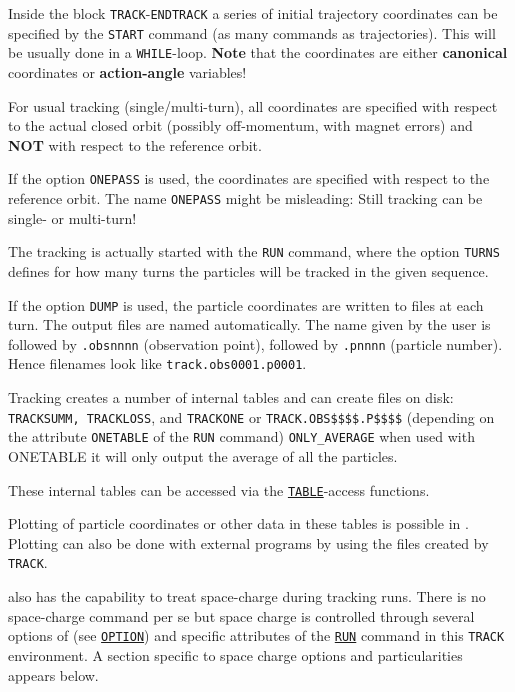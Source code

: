 Inside the block \texttt{TRACK}-\texttt{ENDTRACK} a series 
of initial trajectory coordinates can be specified by the \texttt{START} 
command (as many commands as trajectories). This will be usually done in a 
\texttt{WHILE}-loop. \textbf{Note} that the coordinates are either 
\textbf{canonical} coordinates or \textbf{action-angle} variables!

For usual tracking (single/multi-turn), all coordinates are specified
with respect to the actual closed orbit (possibly off-momentum, with
magnet errors) and \textbf{NOT} with respect to the reference orbit. 

If the option \texttt{ONEPASS} is used, the coordinates are specified
with respect to the reference orbit. The name \texttt{ONEPASS} might be
misleading: Still tracking can be single- or multi-turn!   

The tracking is actually started with the \texttt{RUN} command, where
the option \texttt{TURNS} defines for how many turns the particles will
be tracked in the given sequence. 

If the option \texttt{DUMP} is used, the particle coordinates are
written to files at each turn. The output files are named
automatically. The name given by the user is followed by
\texttt{.obsnnnn} (observation point), followed by
\texttt{.pnnnn} (particle number).\\
Hence filenames look like \texttt{track.obs0001.p0001}.  

Tracking creates a number of internal tables and can create files on disk: 
\texttt{TRACKSUMM, TRACKLOSS}, and \texttt{TRACKONE} or
\texttt{TRACK.OBS\$\$\$\$.P\$\$\$\$} (depending on the attribute
\texttt{ONETABLE} of the \texttt{RUN} command)
\texttt{ONLY\_AVERAGE} when used with ONETABLE it will only output
the average of all the particles. 

These internal tables can be accessed via the
\hyperref[chap:tables]{\texttt{TABLE}}-access functions.

Plotting of particle coordinates or other data in these tables is
possible in \madx. Plotting can also be done with external programs by
using the files created by \texttt{TRACK}.  

\madx also has the capability to treat space-charge during tracking
runs. There is no space-charge command per se but space charge is
controlled through several options of \madx (see
\hyperref[sec:option]{\texttt{OPTION}}) and specific attributes of the
\hyperref[sec:run]{\texttt{RUN}} command in this \texttt{TRACK} environment. A
section specific to space charge options and particularities appears
below.

